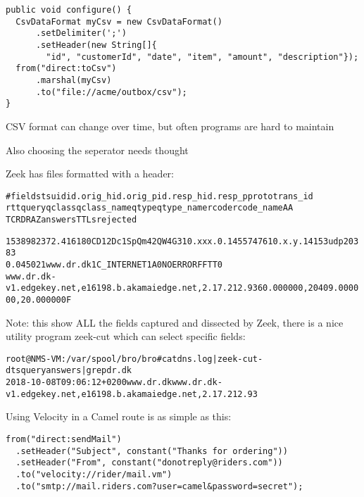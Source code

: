 \documentclass[Screen16to9,17pt]{foils}
\begin{document}

\begin{verbatim}
public void configure() {
  CsvDataFormat myCsv = new CsvDataFormat()
      .setDelimiter(';')
      .setHeader(new String[]{
        "id", "customerId", "date", "item", "amount", "description"});
  from("direct:toCsv")
      .marshal(myCsv)
      .to("file://acme/outbox/csv");
}
\end{verbatim}

\begin{list2}
\item CSV format can change over time, but often programs are hard to maintain
\item Also choosing the seperator needs thought
\end{list2}


Zeek has files formatted with a header:
\begin{alltt}\footnotesize
#fields ts      uid     id.orig_h       id.orig_p       id.resp_h       id.resp_p       proto   trans_id
        rtt     query   qclass  qclass_name     qtype   qtype_name      rcode   rcode_name      AA
        TC      RD      RA      Z       answers TTLs    rejected

1538982372.416180	CD12Dc1SpQm42QW4G3	10.xxx.0.145	57476	10.x.y.141	53	udp	20383
	0.045021	www.dr.dk	1	C_INTERNET	1	A	0	NOERROR	F	F	T	T	0
   www.dr.dk-v1.edgekey.net,e16198.b.akamaiedge.net,2.17.212.93	60.000000,20409.000000,20.000000	F
\end{alltt}

Note: this show ALL the fields captured and dissected by Zeek, there is a nice utility program zeek-cut which can select specific fields:

\begin{alltt}\small
root@NMS-VM:/var/spool/bro/bro# cat dns.log | zeek-cut -d ts query answers | grep dr.dk
2018-10-08T09:06:12+0200	www.dr.dk	www.dr.dk-v1.edgekey.net,e16198.b.akamaiedge.net,2.17.212.93
\end{alltt}







Using Velocity in a Camel route is as simple as this:

\begin{verbatim}
from("direct:sendMail")
  .setHeader("Subject", constant("Thanks for ordering"))
  .setHeader("From", constant("donotreply@riders.com"))
  .to("velocity://rider/mail.vm")
  .to("smtp://mail.riders.com?user=camel&password=secret");
\end{verbatim}
\end{document}
